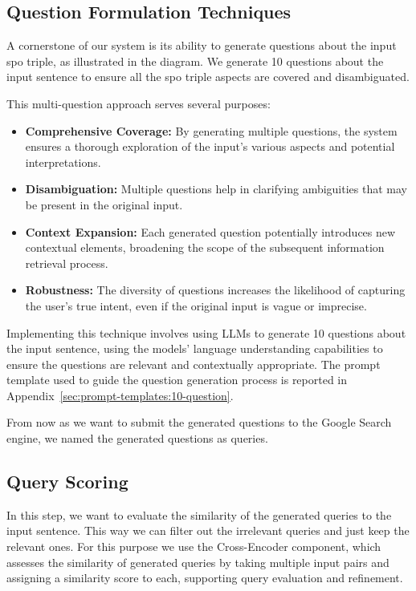 \subsection{Question Formulation Techniques}\label{subsec:question-formulation-techniques}
A cornerstone of our system is its ability to generate questions about the input spo triple, as illustrated in the diagram.
We generate 10 questions about the input sentence to ensure all the spo triple aspects are covered and disambiguated.

This multi-question approach serves several purposes:
\begin{itemize}
    \item \textbf{Comprehensive Coverage:} By generating multiple questions, the system ensures a thorough exploration of the input's various aspects and potential interpretations.
    \item \textbf{Disambiguation:} Multiple questions help in clarifying ambiguities that may be present in the original input.
    \item \textbf{Context Expansion:} Each generated question potentially introduces new contextual elements, broadening the scope of the subsequent information retrieval process.
    \item \textbf{Robustness:} The diversity of questions increases the likelihood of capturing the user's true intent, even if the original input is vague or imprecise.
\end{itemize}

Implementing this technique involves using \acp{LLM} to generate 10 questions about the input sentence, using the models’ language understanding capabilities to ensure the questions are relevant and contextually appropriate.
The prompt template used to guide the question generation process is reported in Appendix~\ref{sec:prompt-templates:10-question}.

From now as we want to submit the generated questions to the Google Search engine, we named the generated questions as queries.

\subsection{Query Scoring}\label{subsec:cross-encoder-for-query-relevance-scoring}
In this step, we want to evaluate the similarity of the generated queries to the input sentence.
This way we can filter out the irrelevant queries and just keep the relevant ones.
For this purpose we use the Cross-Encoder component, which assesses the similarity of generated queries by taking multiple input pairs and assigning a similarity score to each, supporting query evaluation and refinement.

